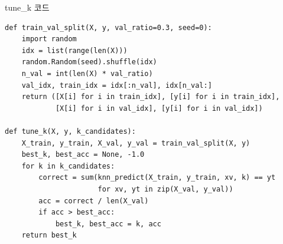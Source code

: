 \begin{frame}[fragile]{tune\_k 코드}
\begin{lstlisting}
def train_val_split(X, y, val_ratio=0.3, seed=0):
    import random
    idx = list(range(len(X)))
    random.Random(seed).shuffle(idx)
    n_val = int(len(X) * val_ratio)
    val_idx, train_idx = idx[:n_val], idx[n_val:]
    return ([X[i] for i in train_idx], [y[i] for i in train_idx],
            [X[i] for i in val_idx], [y[i] for i in val_idx])

def tune_k(X, y, k_candidates):
    X_train, y_train, X_val, y_val = train_val_split(X, y)
    best_k, best_acc = None, -1.0
    for k in k_candidates:
        correct = sum(knn_predict(X_train, y_train, xv, k) == yt
                      for xv, yt in zip(X_val, y_val))
        acc = correct / len(X_val)
        if acc > best_acc:
            best_k, best_acc = k, acc
    return best_k
\end{lstlisting}
  

\end{frame}
